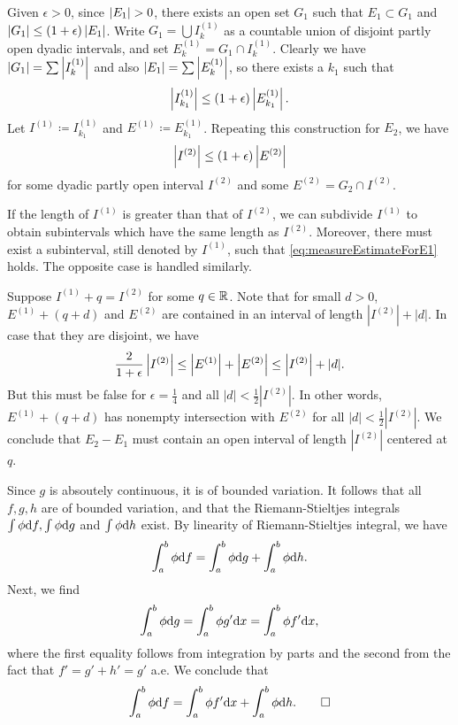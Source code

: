 
\begin{exercise}{7.4}
  Given $\epsilon > 0$, since $\left\vert E_1\right\vert > 0$,
  there exists an open set $G_1$ such that
  $E_1 \subset G_1$ and $\left\vert G_1\right\vert \le (1 + \epsilon) \left\vert E_1\right\vert$.
  Write $G_1 = \bigcup I^{(1)}_k$ as a countable union of
  disjoint partly open dyadic intervals,
  and set $E^{(1)}_k = G_1 \cap I^{(1)}_k$.
  Clearly we have
  $\left\vert G_1\right\vert = \sum \left\vert I^{(1)}_k\right\vert$ and
  also $\left\vert E_1\right\vert = \sum \left\vert E^{(1)}_k\right\vert$,
  so there exists a $k_1$ such that
  \begin{equation}
    \left\vert I^{(1)}_{k_1}\right\vert \le (1 + \epsilon) \left\vert E^{(1)}_{k_1}\right\vert.
    \label{eq:measureEstimateForE1}
  \end{equation}
  Let $I^{(1)} \coloneqq I^{(1)}_{k_1}$ and $E^{(1)} \coloneqq E^{(1)}_{k_1}$.
  Repeating this construction for $E_2$, we have
  \[
    \left\vert I^{(2)}\right\vert \le (1 + \epsilon) \left\vert E^{(2)}\right\vert
  \]
  for some dyadic partly open interval $I^{(2)}$
  and some $E^{(2)} = G_2 \cap I^{(2)}$.

  If the length of $I^{(1)}$ is greater than that of $I^{(2)}$,
  we can subdivide $I^{(1)}$ to obtain
  subintervals which have the same length as $I^{(2)}$.
  Moreover,
  there must exist a subinterval, still denoted by $I^{(1)}$,
  such that \eqref{eq:measureEstimateForE1} holds.
  The opposite case is handled similarly.

  Suppose $I^{(1)} + q = I^{(2)}$ for some $q \in \mathbb{R}$.
  Note that for small $d > 0$,
  $E^{(1)} + (q+d)$ and $E^{(2)}$ are contained in
  an interval of length $|I^{(2)}| + |d|$.
  In case that they are disjoint, we have
  \[
    \frac{2}{1 + \epsilon} \left\vert I^{(2)}\right\vert \le
    \left\vert E^{(1)}\right\vert + \left\vert E^{(2)}\right\vert \le \left\vert I^{(2)}\right\vert + |d|.
  \]
  But this must be false for $\epsilon = \frac{1}{4}$
  and all $|d| < \frac{1}{2} |I^{(2)}|$.
  In other words, $E^{(1)} + (q+d)$ has nonempty intersection with $E^{(2)}$
  for all $|d| < \frac{1}{2}|I^{(2)}|$.
  We conclude that $E_2 - E_1$ must contain an open interval
  of length $|I^{(2)}|$ centered at $q$.
\end{exercise}

\begin{exercise}{7.5}
  Since $g$ is absoutely continuous,
  it is of bounded variation.
  It follows that all $f, g, h$ are of bounded variation,
  and that the Riemann-Stieltjes integrals
  $\int \phi \mathrm{d} f, \int \phi \mathrm{d} g$ and $\int \phi \mathrm{d} h$ exist.
  By linearity of Riemann-Stieltjes integral, we have
  \[
    \int_a^b \phi \mathrm{d} f = \int_a^b \phi \mathrm{d} g + \int_a^b \phi \mathrm{d} h.
  \]
  Next, we find
  \[
    \int_a^b \phi \mathrm{d} g = \int_a^b \phi g' \mathrm{d} x
    = \int_a^b \phi f' \mathrm{d} x,
  \]
  where the first equality follows from integration by parts
  and the second from the fact that $f' = g' + h' = g'$ a.e.
  We conclude that
  \[
    \int_a^b \phi \mathrm{d} f = \int_a^b \phi f' \mathrm{d} x + \int_a^b \phi \mathrm{d} h.
    \qedhere
  \]
\end{exercise}

